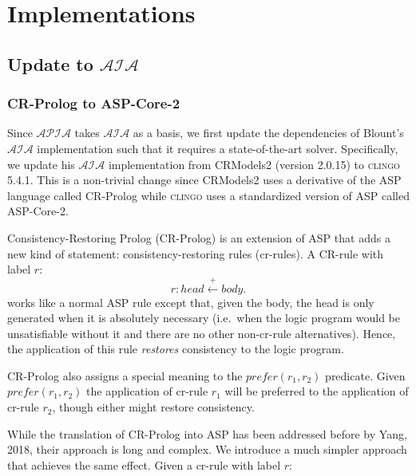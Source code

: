 \chapter{Implementations}

%

\section{Update to $\mathcal{AIA}$}

\subsection{CR-Prolog to ASP-Core-2}

Since $\mathcal{APIA}$ takes $\mathcal{AIA}$ as a basis, we first update the dependencies of Blount's $\mathcal{AIA}$ implementation such that it requires a state-of-the-art solver.
Specifically, we update his $\mathcal{AIA}$ implementation from CRModels2 (version 2.0.15) to \textsc{clingo} 5.4.1.
This is a non-trivial change since CRModels2 uses a derivative of the ASP language called CR-Prolog while \textsc{clingo} uses a standardized version of ASP called ASP-Core-2.

Consistency-Restoring Prolog (CR-Prolog) is an extension of ASP that adds a new kind of statement: consistency-restoring rules (cr-rules).
A CR-rule with label $r$:
\begin{equation}
    r: head \stackrel{+}\leftarrow body.
\end{equation}
works like a normal ASP rule except that, given the body, the head is only generated when it is absolutely necessary (i.e.~when the logic program would be unsatisfiable without it and there are no other non-cr-rule alternatives).
Hence, the application of this rule \textit{restores} consistency to the logic program.

CR-Prolog also assigns a special meaning to the $prefer(r_1, r_2)$ predicate.
Given $prefer(r_1, r_2)$ the application of cr-rule $r_1$ will be preferred to the application of cr-rule $r_2$, though either might restore consistency.

While the translation of CR-Prolog into ASP has been addressed before by Yang, 2018, their approach is long and complex.
We introduce a much simpler approach that achieves the same effect.
Given a cr-rule with label $r$:

